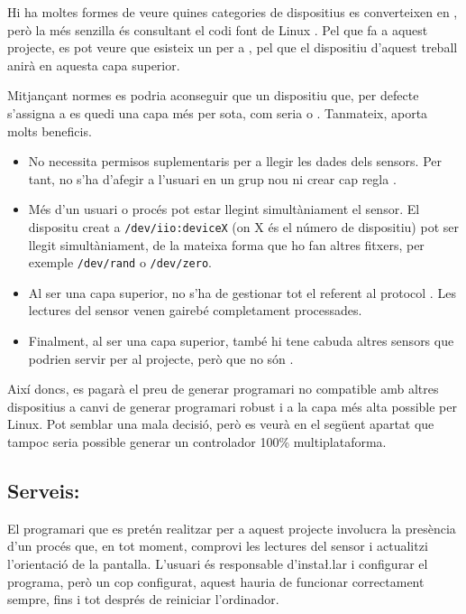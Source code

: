 Hi ha moltes formes de veure quines categories de dispositius  es
converteixen en , però la més senzilla és consultant el codi
font de Linux \cite{KernelIioAccel}. Pel que fa a aquest projecte, es pot veure
que esisteix un  per a , pel que
el dispositiu d'aquest treball anirà en aquesta capa superior.

Mitjançant normes  es podria aconseguir que un dispositiu que, per 
defecte s'assigna a  es quedi una capa més per sota, com seria
 o . Tanmateix,  aporta molts beneficis.

\begin{itemize}
    \item No necessita permisos suplementaris per a llegir les dades dels
    sensors. Per tant, no s'ha d'afegir a l'usuari en un grup nou ni crear
    cap regla .
    \item Més d'un usuari o procés pot estar llegint simultàniament el sensor.
    El dispositu creat a \verb|/dev/iio:deviceX| (on X és el número de
    dispositiu) pot ser llegit simultàniament, de la mateixa forma que ho fan
    altres fitxers, per exemple \verb|/dev/rand| o \verb|/dev/zero|.
    \item Al ser una capa superior, no s'ha de gestionar tot el referent al
    protocol . Les lectures del sensor venen gairebé completament
    processades.
    \item Finalment, al ser una capa superior, també hi tene cabuda altres
    sensors que podrien servir per al projecte, però que no són .
\end{itemize}

Així doncs, es pagarà el preu de generar programari no compatible amb altres
dispositius a canvi de generar programari robust i a la capa més alta possible
per Linux. Pot semblar una mala decisió, però es veurà en el següent apartat
que tampoc seria possible generar un controlador 100\% multiplataforma.

\subsection{Serveis: }
\label{subsec:systemd}

El programari que es pretén realitzar per a aquest projecte involucra la
presència d'un procés que, en tot moment, comprovi les lectures del sensor i
actualitzi l'orientació de la pantalla. L'usuari és responsable d'insta\l.lar i
configurar el programa, però un cop configurat, aquest hauria de funcionar
correctament sempre, fins i tot després de reiniciar l'ordinador.


